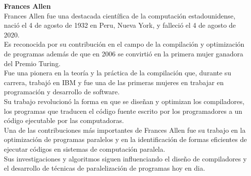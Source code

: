 \textbf{Frances Allen}\\

Frances Allen fue una destacada científica de la computación estadounidense, nació el 4 de agosto de 1932 en Peru, Nueva York, y falleció el 4 de agosto de 2020.\\

Es reconocida por su contribución en el campo de la compilación y optimización de programas además de que en 2006 se convirtió en la primera mujer ganadora del Premio Turing.\\

Fue una pionera en la teoría y la práctica de la compilación que, durante su carrera, trabajó en IBM y fue una de las primeras mujeres en trabajar en programación y desarrollo de software.\\
Su trabajo revolucionó la forma en que se diseñan y optimizan los compiladores, los programas que traducen el código fuente escrito por los programadores a un código ejecutable por las computadoras.\\

Una de las contribuciones más importantes de Frances Allen fue su trabajo en la optimización de programas paralelos y en la identificación de formas eficientes de ejecutar códigos en sistemas de computación paralela.\\
Sus investigaciones y algoritmos siguen influenciando el diseño de compiladores y el desarrollo de técnicas de paralelización de programas hoy en dia.\\